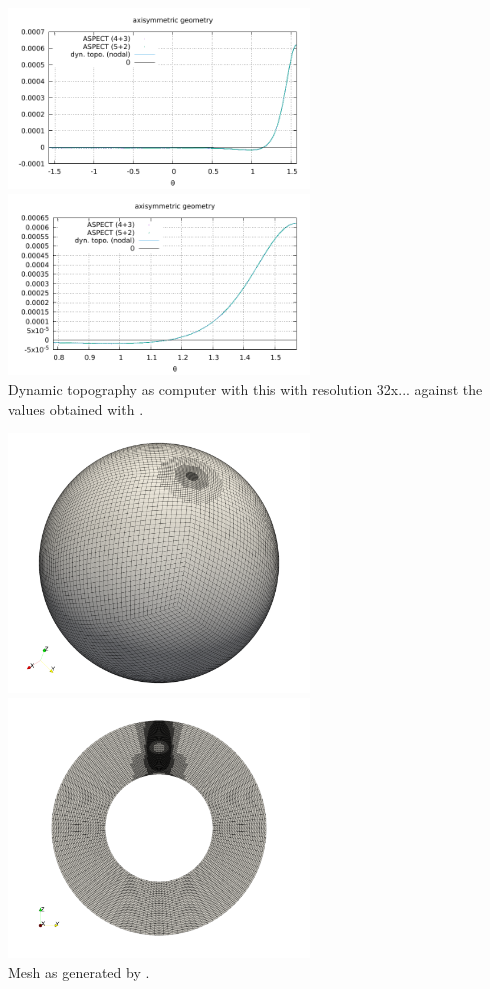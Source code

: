 \begin{center}
\includegraphics[width=8cm]{python_codes/fieldstone_152/results/exp2_axisymmetric/aspect/dynamic_topography.pdf}
\includegraphics[width=8cm]{python_codes/fieldstone_152/results/exp2_axisymmetric/aspect/dynamic_topography_zoom.pdf}\\
{\captionfont Dynamic topography as computer with this \stone with resolution 32x... against the 
values obtained with \aspect.}
\end{center}

\begin{center}
\includegraphics[width=8cm]{python_codes/fieldstone_152/results/exp2_axisymmetric/aspect/mesh}
\includegraphics[width=8cm]{python_codes/fieldstone_152/results/exp2_axisymmetric/aspect/mesh2}\\
{\captionfont Mesh as generated by \aspect.}
\end{center}


